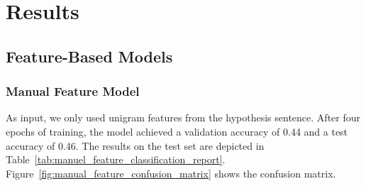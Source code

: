 \documentclass[acmsmall,nonacm]{acmart}
\begin{document}
\section{Results}

\subsection{Feature-Based Models}

\subsubsection{Manual Feature Model}
As input, we only used unigram features from the hypothesis sentence. After four epochs of training, the model achieved a validation accuracy of 0.44 and a test accuracy of 0.46.
The results on the test set are depicted in Table~\ref{tab:manuel_feature_classification_report}. Figure~\ref{fig:manual_feature_confusion_matrix} shows the confusion matrix.
\end{document}
